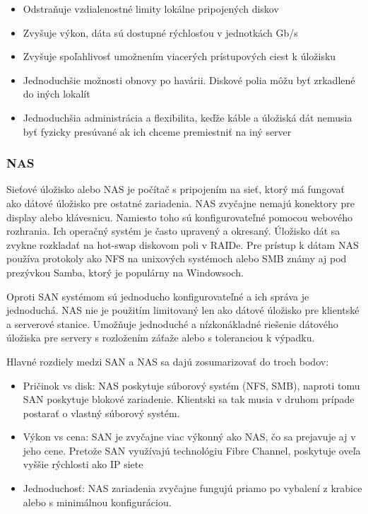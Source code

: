 \begin{itemize}
	\item Odstraňuje vzdialenostné limity lokálne pripojených diskov
	\item Zvyšuje výkon, dáta sú dostupné rýchlosťou v jednotkách Gb/s
	\item Zvyšuje spoľahlivosť umožnením viacerých prístupových ciest k úložisku
	\item Jednoduchšie možnosti obnovy po havárii. Diskové polia môžu byť zrkadlené do iných lokalít
	\item Jednoduchšia administrácia a flexibilita, keďže káble a úložiská dát nemusia byť fyzicky presúvané ak ich chceme premiestniť na iný server
\end{itemize}

\subsubsection{NAS}
Sieťové úložisko alebo \ac{NAS} je počítač s pripojením na sieť, ktorý má fungovať ako dátové úložisko pre ostatné zariadenia. NAS zvyčajne nemajú konektory pre display alebo klávesnicu. Namiesto toho sú konfigurovateľné pomocou webového rozhrania. Ich operačný systém je často upravený a okresaný. Úložisko dát sa zvykne rozkladať na hot-swap diskovom poli v RAIDe. Pre prístup k dátam NAS používa protokoly ako \ac{NFS} na unixových systémoch alebo \ac{SMB} známy aj pod prezývkou Samba, ktorý je populárny na Windowsoch.

Oproti SAN systémom sú jednoducho konfigurovateľné a ich správa je jednoduchá. NAS nie je použitím limitovaný len ako dátové úložisko pre klientské a serverové stanice. Umožňuje jednoduché a nízkonákladné riešenie dátového úložiska pre servery s rozložením záťaže alebo s toleranciou k výpadku.

Hlavné rozdiely medzi SAN a NAS sa dajú zosumarizovať do troch bodov:\cite{web:Difference-Between-NAS-and-SAN-3-Considerations}
\begin{itemize}
	\item Pričinok vs disk: NAS poskytuje súborový systém (NFS, SMB), naproti tomu SAN poskytuje blokové zariadenie. Klientski sa tak musia v druhom prípade postarať o vlastný súborový systém.
	\item Výkon vs cena: SAN je zvyčajne viac výkonný ako NAS, čo sa prejavuje aj v jeho cene. Pretože SAN využívajú technológiu Fibre Channel, poskytuje oveľa vyššie rýchlosti ako IP siete
	\item Jednoduchosť: NAS zariadenia zvyčajne fungujú priamo po vybalení z krabice alebo s minimálnou konfiguráciou.
\end{itemize}

